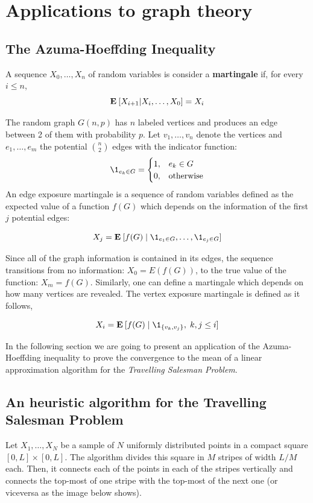 \chapter{Applications to graph theory}

\section{The Azuma-Hoeffding Inequality}

\begin{definition}
    A sequence $X_0, \ldots, X_n$ of random variables is consider a \textbf{martingale} if, for every $i \leq n$,
    \[ \mathbf{E}\: [X_{i+1} | X_i,\ldots, X_0] = X_i \] 
\end{definition}

The random graph $G(n,p)$ has $n$ labeled vertices and produces an edge between 2 of them with probability $p$. Let $v_1, \ldots, v_n$ denote the vertices and $e_1, \ldots, e_m$ the potential $\binom{n}{2}$ edges with the indicator function:
\[\1_{e_k \in G} = \begin{cases}
    1, & e_k \in G\\
    0, & \mbox{otherwise} 
\end{cases} \] 
An edge exposure martingale is a sequence of random variables defined as the expected value of a function $f(G)$ which depends on the information of the first $j$ potential edges:

\[ X_j = \E [f(G) \;|\; \1_{e_1 \in G}, \ldots, \1_{e_j \in G}] \] 

Since all of the graph information is contained in its edges, the sequence transitions from no information: $X_0 = E(f(G))$, to the true value of the function: $X_m = f(G)$. Similarly, one can define a martingale which depends on how many vertices are revealed. The vertex exposure martingale is defined as it follows,

\[ X_i = \E [f(G) \;|\; \1_{\{v_k, v_j\}}, \; k,j \leq i] \] 

In the following section we are going to present an application of the Azuma-Hoeffding inequality to prove the convergence to the mean of a linear approximation algorithm for the \textit{Travelling Salesman Problem}. 

\section{An heuristic algorithm for the Travelling Salesman Problem}

Let $X_1,\ldots, X_N$ be a sample of $N$ uniformly distributed points in a compact square $[0,L]\times [0,L]$. The algorithm divides this square in $M$ stripes of width $L/M$ each. Then, it connects each of the points in each of the stripes vertically and connects the top-most of one stripe with the top-most of the next one (or viceversa as the image below shows).

